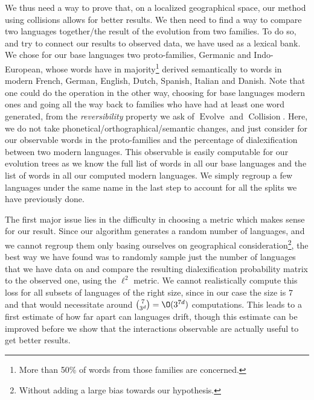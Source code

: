 \documentclass[math, info, english]{cours}
\DeclareMathOperator{\revo}{Evolve}
\DeclareMathOperator{\coll}{Collision}
\begin{document}
We thus need a way to prove that, on a localized geographical space, our method using collisions allows for better results.
We then need to find a way to compare two languages together/the result of the evolution from two families.
To do so, and try to connect our results to observed data, we have used \cite{evosem} as a lexical bank.
We chose for our base languages two proto-families, Germanic and Indo-European, whose words have in majority\footnote{More than 50\% of words from those families are concerned.}
derived semantically to words in modern French, German, English, Dutch, Spanish, Italian and Danish.
Note that one could do the operation in the other way, choosing for base languages modern ones and going all the way back to families who have had at least one word generated, from the \textit{reversibility} property we ask of $\revo$ and $\coll$.
Here, we do not take phonetical/orthographical/semantic changes, and just consider for our observable words in the proto-families and the percentage of dialexification between two modern languages.
This observable is easily computable for our evolution trees as we know the full list of words in all our base languages and the list of words in all our computed modern languages.
We simply regroup a few languages under the same name in the last step to account for all the splits we have previously done.

\medskip

The first major issue lies in the difficulty in choosing a metric which makes sense for our result.
Since our algorithm generates a random number of languages, and we cannot regroup them only basing ourselves on geographical consideration\footnote{Without adding a large bias towards our hypothesis.}, the best way we have found was to randomly sample just the number of languages that we have data on and compare the resulting dialexification probability matrix to the observed one, using the $\ell^{2}$ metric.
We cannot realistically compute this loss for all subsets of languages of the right size, since in our case the size is $7$ and that would necessitate around $\binom{7}{3^{d}} = \O(3^{7d})$ computations.
This leads to a first estimate of how far apart can languages drift, though this estimate can be improved before we show that the interactions observable are actually useful to get better results.

\medskip
\end{document}
